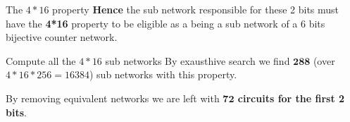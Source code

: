 \documentclass{beamer}
\begin{document}
\begin{frame}{The $4*16$ property} 
	\textbf{Hence} the sub network responsible for these 2 bits must have the \textbf{4*16} property to be eligible as a being a sub network of a 6 bits bijective counter network.
	\medskip\pause
	
	\centering{}
\end{frame}

\begin{frame}{Compute all the $4*16$ sub networks} 
	By exausthive search we find $\boldsymbol{288}$ (over $4*16*256=16384$) sub networks with this property.\medskip
	
	By removing equivalent networks we are left with \textbf{$\boldsymbol{72}$ circuits for the first 2 bits}.
\end{frame}
\end{document}
